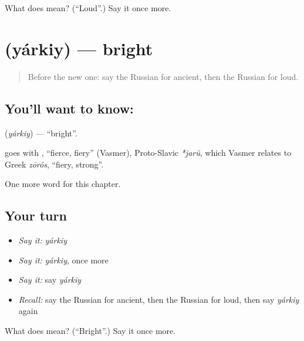 \begin{tcolorbox}[breakable,colback=teal!4,colframe=teal!35!black,title={Before you move on}]
What does  mean? (\textquotedblleft{}Loud\textquotedblright{}.) Say it once more.
\end{tcolorbox}
\section[\texorpdfstring{\ru{яркий} (yárkiy)}{яркий (yárkiy)}]{ (yárkiy) — bright}

\label{lesson:RU-C244-yarkiy}



\begin{quote}
Before the new one: say the Russian for ancient, then the Russian for loud.
\end{quote}

\subsection*{You'll want to know: }
\textbf{} (\emph{yárkiy}) — \textquotedblleft{}bright\textquotedblright{}.

\begin{cousinweb}
\textbf{} goes with \emph{}, \textquotedblleft{}fierce, fiery\textquotedblright{} (Vasmer), Proto-Slavic \emph{*jarŭ}, which Vasmer relates to Greek \emph{zōrós}, \textquotedblleft{}fiery, strong\textquotedblright{}.
\end{cousinweb}

\begin{grammarlens}[title={What you've built}]
One more word for this chapter.
\end{grammarlens}

\subsection*{Your turn}
\begin{itemize}
\raggedright
  \item \emph{Say it:} \emph{yárkiy}
  \item \emph{Say it:} \emph{yárkiy}, once more
  \item \emph{Say it:} say \emph{yárkiy}
  \item \emph{Recall:} say the Russian for ancient, then the Russian for loud, then say \emph{yárkiy} again
\end{itemize}

\begin{tcolorbox}[breakable,colback=teal!4,colframe=teal!35!black,title={Before you move on}]
What does  mean? (\textquotedblleft{}Bright\textquotedblright{}.) Say it once more.
\end{tcolorbox}
